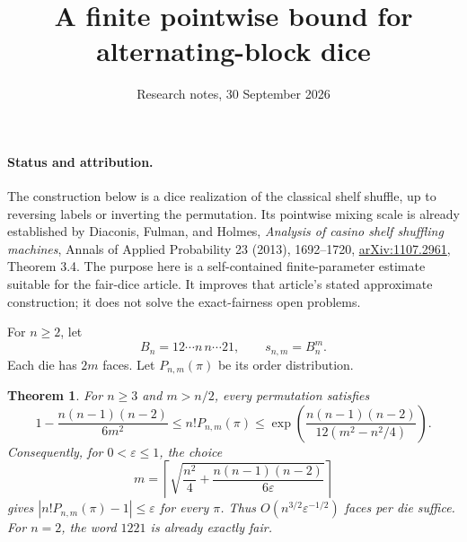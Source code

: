 \documentclass[11pt]{article}
\title{A finite pointwise bound for alternating-block dice}
\author{Research notes, 30 September 2026}
\date{}
\newtheorem{theorem}{Theorem}
\begin{document}
\maketitle

\paragraph{Status and attribution.}
The construction below is a dice realization of the classical shelf shuffle,
up to reversing labels or inverting the permutation. Its pointwise mixing
scale is already established by Diaconis, Fulman, and Holmes,
\emph{Analysis of casino shelf shuffling machines}, Annals of Applied
Probability 23 (2013), 1692--1720,
\href{https://arxiv.org/abs/1107.2961}{arXiv:1107.2961}, Theorem 3.4.
The purpose here is a self-contained finite-parameter estimate suitable for
the fair-dice article. It improves that article's stated approximate
construction; it does not solve the exact-fairness open problems.

For $n\geq2$, let
\[
 B_n=12\cdots n\,n\cdots21,\qquad s_{n,m}=B_n^m.
\]
Each die has $2m$ faces. Let $P_{n,m}(\pi)$ be its order distribution.

\begin{theorem}
For $n\geq3$ and $m>n/2$, every permutation satisfies
\[
 1-\frac{n(n-1)(n-2)}{6m^2}
 \leq n!P_{n,m}(\pi)
 \leq
 \exp\left(\frac{n(n-1)(n-2)}{12(m^2-n^2/4)}\right).
\]
Consequently, for $0<\varepsilon\leq1$, the choice
\[
 m=\left\lceil\sqrt{\frac{n^2}{4}
          +\frac{n(n-1)(n-2)}{6\varepsilon}}\right\rceil
\]
gives $|n!P_{n,m}(\pi)-1|\leq\varepsilon$ for every $\pi$.
Thus $O(n^{3/2}\varepsilon^{-1/2})$ faces per die suffice.
For $n=2$, the word $1221$ is already exactly fair.
\end{theorem}
\end{document}
